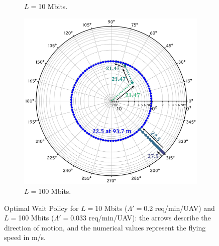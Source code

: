 \documentclass[12pt, draftcls, onecolumn]{IEEEtran}
\theoremstyle{plain}
\theoremstyle{definition}
\theoremstyle{remark}
\begin{document}
\begin{enumerate}
\begin{figure} [t]
\begin{subfigure}{0.5\linewidth}
          \caption{$L=$10 Mbits.}
          \label{FRC1}
        \end{subfigure}
        \hfill
        \begin{subfigure}{0.5\linewidth}
          \centering
          \includegraphics[width=1.0\linewidth]{figs/Waiting_Policy_100Mb.jpeg}
          \caption{$L=$100 Mbits.}
          \label{FRC2}
        \end{subfigure}
        \caption{Optimal Wait Policy for $L=$10 Mbits ($\Lambda'{=}$0.2 req/min/UAV) and $L=$100 Mbits ($\Lambda'{=}$0.033 req/min/UAV): the arrows describe the direction of motion, and the numerical values represent the flying speed in m/s.}
        \label{FRC1and2}
    \end{figure}
    \vspace{2mm}


\end{enumerate}
\end{document}
